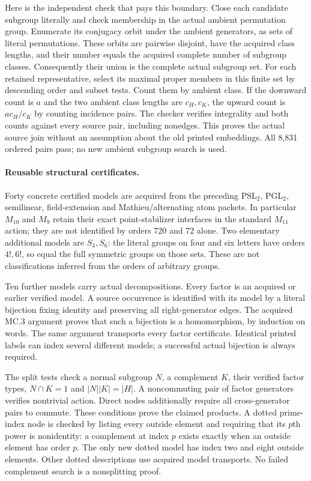 \documentclass[11pt]{article}
\begin{document}
Here is the independent check that pays this boundary. Close each candidate
subgroup literally and check membership in the actual ambient permutation
group. Enumerate its conjugacy orbit under the ambient generators, as
sets of literal permutations. These orbits are pairwise disjoint, have the
acquired class lengths, and their number equals the acquired complete
number of subgroup classes. Consequently their union is the complete
actual subgroup set. For each retained representative, select its maximal
proper members in this finite set by descending order and subset tests.
Count them by ambient class. If the downward count is $a$ and the two
ambient class lengths are $c_H,c_K$, the upward count is $ac_H/c_K$ by
counting incidence pairs. The checker verifies integrality and both counts
against every source pair, including nonedges. This proves the actual
source join without an assumption about the old printed embeddings.
All 8,831 ordered pairs pass; no new ambient subgroup search is used.

\newpage
\paragraph{Reusable structural certificates.}
Forty concrete certified models are acquired from the preceding PSL$_2$,
PGL$_2$, semilinear, field-extension and Mathieu/alternating atom packets.
In particular $M_{10}$ and $M_9$ retain their exact point-stabilizer
interfaces in the standard $M_{11}$ action; they are not identified by
orders 720 and 72 alone. Two elementary additional models are $S_4,S_6$:
the literal groups on four and six letters have orders $4!,6!$, so equal
the full symmetric groups on those sets. These are not classifications
inferred from the orders of arbitrary groups.

Ten further models carry actual decompositions. Every factor is an
acquired or earlier verified model. A source occurrence is identified
with its model by a literal bijection fixing identity and preserving all
right-generator edges. The acquired MC.3 argument proves that such a
bijection is a homomorphism, by induction on words. The same argument
transports every factor certificate. Identical printed labels can index
several different models; a successful actual bijection is always required.

The split tests check a normal subgroup $N$, a complement $K$, their
verified factor types, $N\cap K=1$ and $|N||K|=|H|$. A noncommuting pair
of factor generators verifies nontrivial action. Direct nodes additionally
require all cross-generator pairs to commute. These conditions prove the
claimed products. A dotted prime-index node is checked by listing every
outside element and requiring that its $p$th power is nonidentity:
a complement at index $p$ exists exactly when an outside element has
order $p$. The only new dotted model has index two and eight outside
elements. Other dotted descriptions use acquired model transports.
No failed complement search is a nonsplitting proof.
\end{document}
